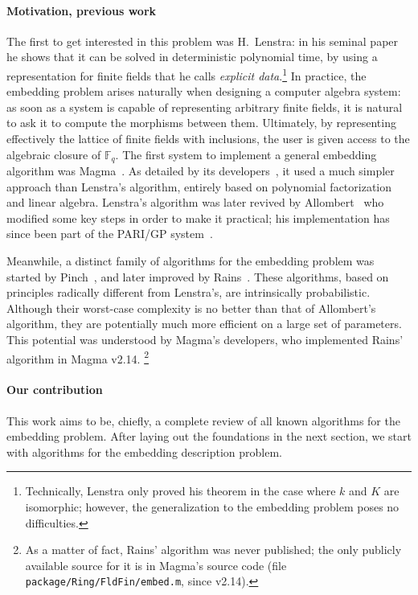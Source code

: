 \documentclass[12pt]{article}
\theoremstyle{plain}
\theoremstyle{definition}
\def\F{\ensuremath{\mathbb{F}}}
\newcounter{algorithm}
\begin{document}
\paragraph{Motivation, previous work}
The first to get interested in this problem was H.~Lenstra: in his
seminal paper~\cite{LenstraJr91} he shows that it can be solved in
deterministic polynomial time, by using a representation for finite
fields that he calls \emph{explicit data}.\footnote{Technically,
  Lenstra only proved his theorem in the case where $k$ and $K$ are
  isomorphic; however, the generalization to the embedding problem
  poses no difficulties.} %
In practice, the embedding problem arises naturally when designing a
computer algebra system: as soon as a system is capable of
representing arbitrary finite fields, it is natural to ask it to
compute the morphisms between them. %
Ultimately, by representing effectively the lattice of finite fields
with inclusions, the user is given access to the algebraic closure of
$\F_q$. %
The first system to implement a general embedding algorithm was
Magma~\cite{MAGMA}. %
As detailed by its developers~\cite{bosma+cannon+steel97}, it used a
much simpler approach than Lenstra's algorithm, entirely based on
polynomial factorization and linear algebra. %
Lenstra's algorithm was later revived by
Allombert~\cite{Allombert02,Allombert02-rev} who modified some key
steps in order to make it practical; his implementation has since been
part of the PARI/GP system~\cite{Pari}.

Meanwhile, a distinct family of algorithms for the embedding problem
was started by Pinch~\cite{Pinch}, and later improved by
Rains~\cite{rains2008}. %
These algorithms, based on principles radically different from
Lenstra's, are intrinsically probabilistic. %
Although their worst-case complexity is no better than that of
Allombert's algorithm, they are potentially much more efficient on a
large set of parameters. %
This potential was understood by Magma's developers, who implemented
Rains' algorithm in Magma v2.14.%
\footnote{As a matter of fact, Rains' algorithm was never published;
  the only publicly available source for it is in Magma's source code
  (file \texttt{package/Ring/FldFin/embed.m}, since v2.14).}


\paragraph{Our contribution}
This work aims to be, chiefly, a complete review of all known
algorithms for the embedding problem. %
After laying out the foundations in the next section, we start with
algorithms for the embedding description problem. %
\end{document}
